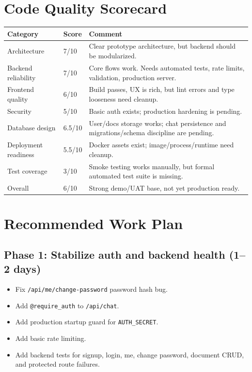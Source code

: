 \documentclass[11pt]{article}
\begin{document}
\section{Code Quality Scorecard}

\begin{longtable}{|p{}|p{}|p{}|}
\hline
\textbf{Category} & \textbf{Score} & \textbf{Comment} \\
\hline
Architecture & 7/10 & Clear prototype architecture, but backend should be modularized. \\
\hline
Backend reliability & 7/10 & Core flows work. Needs automated tests, rate limits, validation, production server. \\
\hline
Frontend quality & 6/10 & Build passes, UX is rich, but lint errors and type looseness need cleanup. \\
\hline
Security & 5/10 & Basic auth exists; production hardening is pending. \\
\hline
Database design & 6.5/10 & User/docs storage works; chat persistence and migrations/schema discipline are pending. \\
\hline
Deployment readiness & 5.5/10 & Docker assets exist; image/process/runtime need cleanup. \\
\hline
Test coverage & 3/10 & Smoke testing works manually, but formal automated test suite is missing. \\
\hline
Overall & 6/10 & Strong demo/UAT base, not yet production ready. \\
\hline
\end{longtable}

\section{Recommended Work Plan}

\subsection{Phase 1: Stabilize auth and backend health (1--2 days)}
\begin{itemize}
  \item Fix \texttt{/api/me/change-password} password hash bug.
  \item Add \texttt{@require\_auth} to \texttt{/api/chat}.
  \item Add production startup guard for \texttt{AUTH\_SECRET}.
  \item Add basic rate limiting.
  \item Add backend tests for signup, login, me, change password, document CRUD, and protected route failures.
\end{itemize}
\end{document}
